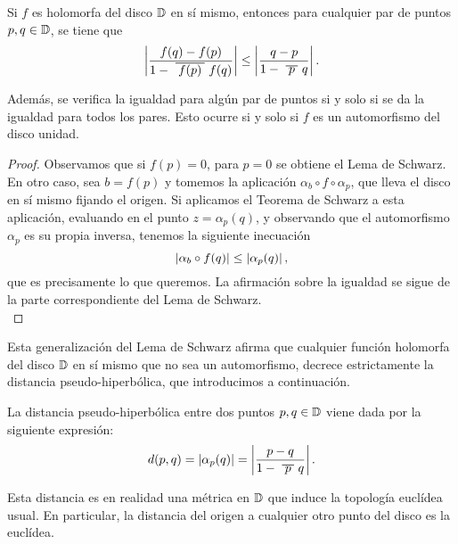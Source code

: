 \begin{theorem}
    Si $f$ es holomorfa del disco $\mathbb{D}$ en sí mismo, entonces para cualquier par de puntos $p, q \in \mathbb{D}$, se tiene que
    \begin{equation*}
        \abs{\frac{f(q) - f(p)}{1 - \xbar{f(p)}f(q)}} \leq \abs{\frac{q-p}{1 - \xbar{p}q}}.
    \end{equation*}

    Además, se verifica la igualdad para algún par de puntos si y solo si se da la igualdad para todos los pares. Esto ocurre si y solo si $f$ es un automorfismo del disco unidad.
\end{theorem}

\begin{proof}
    Observamos que si $f(p) = 0$, para $p = 0$ se obtiene el Lema de Schwarz. En otro caso, sea $b = f(p)$ y tomemos la aplicación $\alpha_b \circ f \circ \alpha_p$, que lleva el disco en sí mismo fijando el origen. Si aplicamos el Teorema de Schwarz a esta aplicación, evaluando en el punto $z = \alpha_p(q)$, y observando que el automorfismo $\alpha_p$ es su propia inversa, tenemos la siguiente inecuación
    \begin{equation*}
        \left\lvert\alpha_b \circ f(q)\right\rvert \leq \left\lvert\alpha_p(q)\right\rvert,
    \end{equation*}
    que es precisamente lo que queremos. La afirmación sobre la igualdad se sigue de la parte correspondiente del Lema de Schwarz. \\
\end{proof}

Esta generalización del Lema de Schwarz afirma que cualquier función holomorfa del disco $\mathbb{D}$ en sí mismo que no sea un automorfismo, decrece estrictamente la distancia pseudo-hiperbólica, que introducimos a continuación. \\

\begin{definition}
    La distancia pseudo-hiperbólica entre dos puntos $p, q \in \mathbb{D}$ viene dada por la siguiente expresión:
    \begin{equation*}
        d(p,q) = \abs{\alpha_p(q)} = \abs{\frac{p-q}{1 - \xbar{p} q}}.
    \end{equation*}
\end{definition}

Esta distancia es en realidad una métrica en $\mathbb{D}$ que induce la topología euclídea usual. En particular, la distancia del origen a cualquier otro punto del disco es la euclídea. \\

